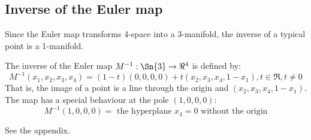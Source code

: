 \documentclass[11pt]{article}
\begin{document}
\subsection{Inverse of the Euler map}
\label{sec:inveuler}

Since the Euler map transforms 4-space into a 3-manifold,
the inverse of a typical point is a 1-manifold.

\begin{lemma}
\label{lem:inverse}
The inverse of the Euler map $M^{-1}: \Sn{3} \rightarrow \Re^4$ 
is defined by:
\begin{equation}
M^{-1}(x_1,x_2,x_3,x_4) = (1-t)(0,0,0,0) + t(x_2,x_3,x_4,1-x_1), t \in \Re, t \neq 0
\end{equation}
That is, the image of a point is a line through the origin
and $(x_2,x_3,x_4,1-x_1)$.
The map has a special behaviour at the pole $(1,0,0,0)$:
\begin{equation}
\label{eqn:eulerpole}
M^{-1}(1,0,0,0) = \mbox{ the hyperplane $x_4=0$ without the origin}
\end{equation}
\end{lemma}
\prf 
See the appendix.
\QED

\end{document}
